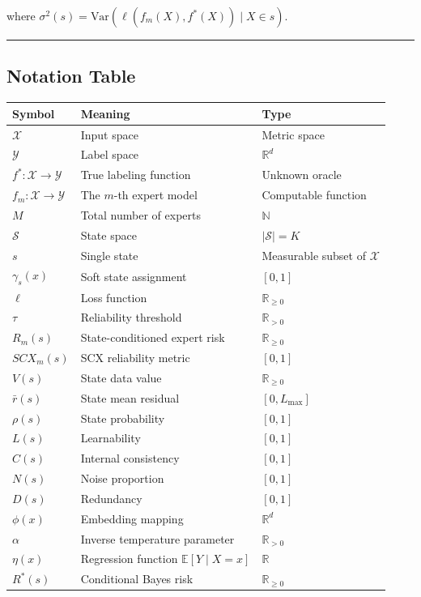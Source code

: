 \documentclass[
  12pt,
]{ctexart}
\begin{document}
where \(\sigma^2(s) = \text{Var}(\ell(f_m(X), f^*(X)) \mid X \in s)\).

\begin{center}\rule{0.5\linewidth}{0.5pt}\end{center}

\subsection{Notation Table}\label{notation-table}

\begin{longtable}[]{@{}lll@{}}
\toprule\noalign{}
Symbol & Meaning & Type \\
\midrule\noalign{}
\endhead
\bottomrule\noalign{}
\endlastfoot
\(\mathcal{X}\) & Input space & Metric space \\
\(\mathcal{Y}\) & Label space & \(\mathbb{R}^d\) \\
\(f^*: \mathcal{X} \to \mathcal{Y}\) & True labeling function & Unknown oracle \\
\(f_m: \mathcal{X} \to \mathcal{Y}\) & The \(m\)-th expert model &
Computable function \\
\(M\) & Total number of experts & \(\mathbb{N}\) \\
\(\mathcal{S}\) & State space & \(|\mathcal{S}| = K\) \\
\(s\) & Single state & Measurable subset of \(\mathcal{X}\) \\
\(\gamma_s(x)\) & Soft state assignment & \([0,1]\) \\
\(\ell\) & Loss function & \(\mathbb{R}_{\ge 0}\) \\
\(\tau\) & Reliability threshold & \(\mathbb{R}_{>0}\) \\
\(R_m(s)\) & State-conditioned expert risk & \(\mathbb{R}_{\ge 0}\) \\
\(SCX_m(s)\) & SCX reliability metric & \([0, 1]\) \\
\(V(s)\) & State data value & \(\mathbb{R}_{\ge 0}\) \\
\(\bar{r}(s)\) & State mean residual & \([0, L_{\max}]\) \\
\(\rho(s)\) & State probability & \([0, 1]\) \\
\(L(s)\) & Learnability & \([0, 1]\) \\
\(C(s)\) & Internal consistency & \([0, 1]\) \\
\(N(s)\) & Noise proportion & \([0, 1]\) \\
\(D(s)\) & Redundancy & \([0, 1]\) \\
\(\phi(x)\) & Embedding mapping & \(\mathbb{R}^d\) \\
\(\alpha\) & Inverse temperature parameter & \(\mathbb{R}_{>0}\) \\
\(\eta(x)\) & Regression function \(\mathbb{E}[Y \mid X=x]\) & \(\mathbb{R}\) \\
\(R^*(s)\) & Conditional Bayes risk & \(\mathbb{R}_{\ge 0}\) \\
\end{longtable}
\end{document}
